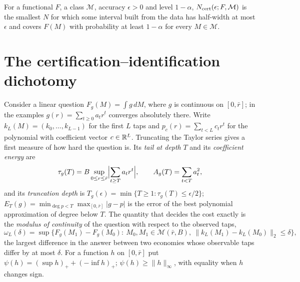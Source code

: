 \begin{definition}\label{def:ncert}
For a functional $F$, a class $\mathcal M$, accuracy $\epsilon>0$ and level $1-\alpha$, $N_{\rm cert}(\epsilon;F,\mathcal M)$ is the smallest $N$ for which some interval built from the data has half-width at most $\epsilon$ and covers $F(M)$ with probability at least $1-\alpha$ for every $M\in\mathcal M$.
\end{definition}

\section{The certification--identification dichotomy}\label{sec:fw_dich}

Consider a linear question $F_g(M)=\int g\,dM$, where $g$ is continuous on $[0,\bar r]$; in the examples $g(r)=\sum_{t\ge0}a_t r^t$ converges absolutely there. Write $k_L(M)=(k_0,\dots,k_{L-1})$ for the first $L$ taps and $p_c(r)=\sum_{t<L}c_tr^t$ for the polynomial with coefficient vector $c\in\mathbb{R}^L$. Truncating the Taylor series gives a first measure of how hard the question is. Its \emph{tail at depth} $T$ and its \emph{coefficient energy} are
\[
\tau_g(T)=B\sup_{0\le r\le\bar r}\Bigl|\sum_{t\ge T}a_t r^t\Bigr|,\qquad A_g(T)=\sum_{t<T}a_t^2,
\]
and its \emph{truncation depth} is $T_g(\epsilon)=\min\{T\ge1:\tau_g(T)\le\epsilon/2\}$; $E_T(g)=\min_{\deg p<T}\max_{[0,\bar r]}|g-p|$ is the error of the best polynomial approximation of degree below $T$. The quantity that decides the cost exactly is the \emph{modulus of continuity} of the question with respect to the observed taps,
\[
\omega_L(\delta)=\sup\bigl\{F_g(M_1)-F_g(M_0):\ M_0,M_1\in\mathcal M(\bar r,B),\ \|k_L(M_1)-k_L(M_0)\|_2\le\delta\bigr\},
\]
the largest difference in the answer between two economies whose observable taps differ by at most $\delta$. For a function $h$ on $[0,\bar r]$ put $\psi(h)=(\sup h)_++(-\inf h)_+$; $\psi(h)\ge\|h\|_\infty$, with equality when $h$ changes sign.

